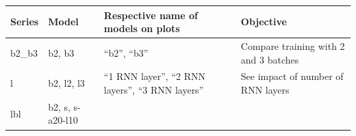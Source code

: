 \begin{longtable}[]{@{}llll@{}}
\hline
\begin{minipage}[b]{0.04\columnwidth}\raggedright\strut
Series\strut
\end{minipage} & \begin{minipage}[b]{0.08\columnwidth}\raggedright\strut
Model\strut
\end{minipage} & \begin{minipage}[b]{0.30\columnwidth}\raggedright\strut
Respective name of models on plots\strut
\end{minipage} & \begin{minipage}[b]{0.46\columnwidth}\raggedright\strut
Objective\strut
\end{minipage}\tabularnewline
\hline
\endhead
\begin{minipage}[t]{0.04\columnwidth}\raggedright\strut
b2\_b3\strut
\end{minipage} & \begin{minipage}[t]{0.08\columnwidth}\raggedright\strut
b2, b3\strut
\end{minipage} & \begin{minipage}[t]{0.30\columnwidth}\raggedright\strut
``b2'', ``b3''\strut
\end{minipage} & \begin{minipage}[t]{0.46\columnwidth}\raggedright\strut
Compare training with 2 and 3 batches\strut
\end{minipage}\tabularnewline
\begin{minipage}[t]{0.04\columnwidth}\raggedright\strut
l\strut
\end{minipage} & \begin{minipage}[t]{0.08\columnwidth}\raggedright\strut
b2, l2, l3\strut
\end{minipage} & \begin{minipage}[t]{0.30\columnwidth}\raggedright\strut
``1 RNN layer'', ``2 RNN layers'', ``3 RNN layers''\strut
\end{minipage} & \begin{minipage}[t]{0.46\columnwidth}\raggedright\strut
See impact of number of RNN layers\strut
\end{minipage}\tabularnewline
\begin{minipage}[t]{0.04\columnwidth}\raggedright\strut
lbl\strut
\end{minipage} & \begin{minipage}[t]{0.08\columnwidth}\raggedright\strut
b2, s, s-a20-l10\strut
\end{minipage} & \begin{minipage}[t]{0.30\columnwidth}\raggedright\strut

\end{minipage}
\end{longtable}
